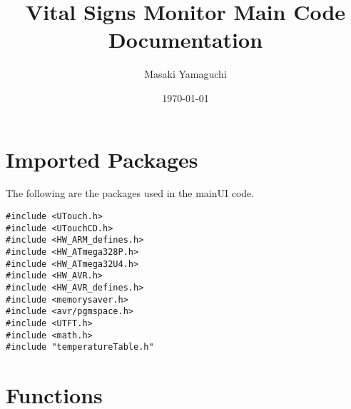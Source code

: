 \documentclass[11pt,letter]{article}
\begin{document}
\title{Vital Signs Monitor Main Code Documentation}

\author{Masaki Yamaguchi}

\date{\today}

\maketitle 
\lstset{language=C}  

\section{Imported Packages}
The following are the packages used in the mainUI code. 
\begin{lstlisting}
#include <UTouch.h>
#include <UTouchCD.h>
#include <HW_ARM_defines.h>
#include <HW_ATmega328P.h>
#include <HW_ATmega32U4.h>
#include <HW_AVR.h>
#include <HW_AVR_defines.h>
#include <memorysaver.h>
#include <avr/pgmspace.h>
#include <UTFT.h>
#include <math.h>
#include "temperatureTable.h"
\end{lstlisting}

\section{Functions}
\end{document}
